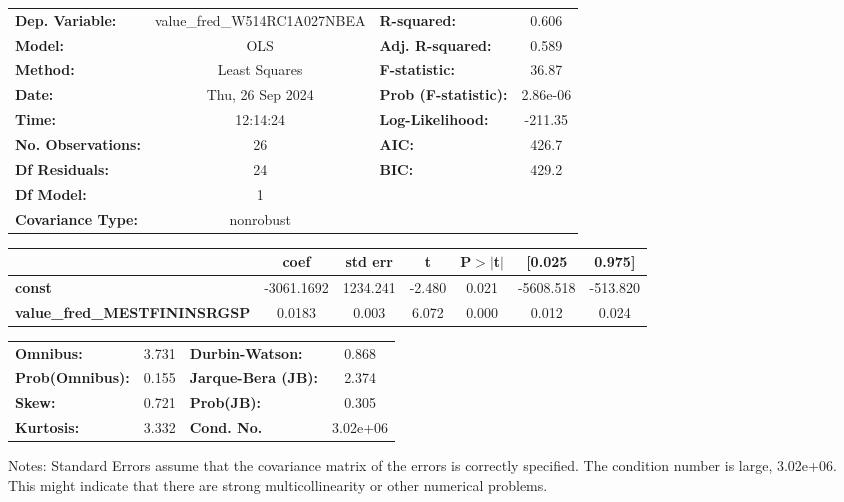 \begin{center}
\begin{tabular}{lclc}
\toprule
\textbf{Dep. Variable:}              & value\_fred\_W514RC1A027NBEA & \textbf{  R-squared:         } &     0.606   \\
\textbf{Model:}                      &             OLS              & \textbf{  Adj. R-squared:    } &     0.589   \\
\textbf{Method:}                     &        Least Squares         & \textbf{  F-statistic:       } &     36.87   \\
\textbf{Date:}                       &       Thu, 26 Sep 2024       & \textbf{  Prob (F-statistic):} &  2.86e-06   \\
\textbf{Time:}                       &           12:14:24           & \textbf{  Log-Likelihood:    } &   -211.35   \\
\textbf{No. Observations:}           &                26            & \textbf{  AIC:               } &     426.7   \\
\textbf{Df Residuals:}               &                24            & \textbf{  BIC:               } &     429.2   \\
\textbf{Df Model:}                   &                 1            & \textbf{                     } &             \\
\textbf{Covariance Type:}            &          nonrobust           & \textbf{                     } &             \\
\bottomrule
\end{tabular}
\begin{tabular}{lcccccc}
                                     & \textbf{coef} & \textbf{std err} & \textbf{t} & \textbf{P$> |$t$|$} & \textbf{[0.025} & \textbf{0.975]}  \\
\midrule
\textbf{const}                       &   -3061.1692  &     1234.241     &    -2.480  &         0.021        &    -5608.518    &     -513.820     \\
\textbf{value\_fred\_MESTFININSRGSP} &       0.0183  &        0.003     &     6.072  &         0.000        &        0.012    &        0.024     \\
\bottomrule
\end{tabular}
\begin{tabular}{lclc}
\textbf{Omnibus:}       &  3.731 & \textbf{  Durbin-Watson:     } &    0.868  \\
\textbf{Prob(Omnibus):} &  0.155 & \textbf{  Jarque-Bera (JB):  } &    2.374  \\
\textbf{Skew:}          &  0.721 & \textbf{  Prob(JB):          } &    0.305  \\
\textbf{Kurtosis:}      &  3.332 & \textbf{  Cond. No.          } & 3.02e+06  \\
\bottomrule
\end{tabular}
\end{center}

Notes: \newline
 [1] Standard Errors assume that the covariance matrix of the errors is correctly specified. \newline
 [2] The condition number is large, 3.02e+06. This might indicate that there are \newline
 strong multicollinearity or other numerical problems.